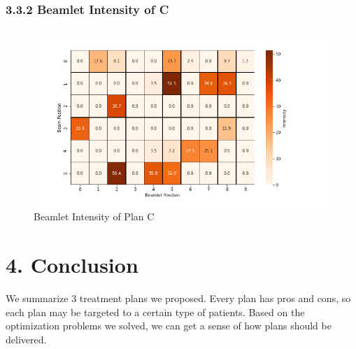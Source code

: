 \documentclass{report}
\begin{document}
\subsubsection{3.3.2 Beamlet Intensity of C}

\begin{figure}[H]
    \centering
    \includegraphics[width=0.6\columnwidth]{c-intensity.png}
    \caption{Beamlet Intensity of Plan C}
    
\end{figure}

\section{4. Conclusion}
We summarize 3 treatment plans we proposed. Every plan has pros and cons, so each plan may be targeted to a certain type of patients. Based on the optimization problems we solved, we can get a sense of how plans should be delivered.
\end{document}
